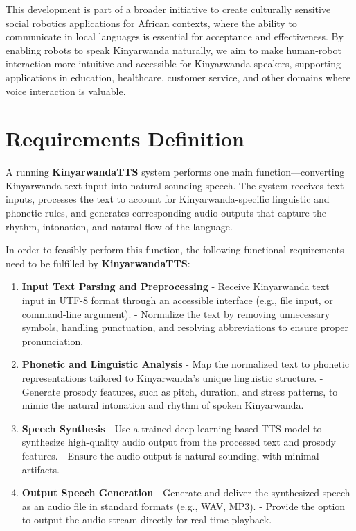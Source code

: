 \documentclass{CSSRforAfrica}
\begin{document}
This development is part of a broader initiative to create culturally sensitive social robotics applications for African contexts, where the ability to communicate in local languages is essential for acceptance and effectiveness. By enabling robots to speak Kinyarwanda naturally, we aim to make human-robot interaction more intuitive and accessible for Kinyarwanda speakers, supporting applications in education, healthcare, customer service, and other domains where voice interaction is valuable.

 
\newpage
\section{Requirements Definition}

A running \textbf{KinyarwandaTTS} system performs one main function—converting Kinyarwanda text input into natural-sounding speech. The system receives text inputs, processes the text to account for Kinyarwanda-specific linguistic and phonetic rules, and generates corresponding audio outputs that capture the rhythm, intonation, and natural flow of the language.  

In order to feasibly perform this function, the following functional requirements need to be fulfilled by \textbf{KinyarwandaTTS}:  

\begin{enumerate}

\item \textbf{Input Text Parsing and Preprocessing}  
   - Receive Kinyarwanda text input in UTF-8 format through an accessible interface (e.g., file input, or command-line argument).  
   - Normalize the text by removing unnecessary symbols, handling punctuation, and resolving abbreviations to ensure proper pronunciation.  

\item \textbf{Phonetic and Linguistic Analysis}  
   - Map the normalized text to phonetic representations tailored to Kinyarwanda's unique linguistic structure.  
   - Generate prosody features, such as pitch, duration, and stress patterns, to mimic the natural intonation and rhythm of spoken Kinyarwanda.  

\item \textbf{Speech Synthesis}
   - Use a trained deep learning-based TTS model to synthesize high-quality audio output from the processed text and prosody features.  
   - Ensure the audio output is natural-sounding, with minimal artifacts.  

\item \textbf{Output Speech Generation}  
   - Generate and deliver the synthesized speech as an audio file in standard formats (e.g., WAV, MP3).  
   - Provide the option to output the audio stream directly for real-time playback.  



\end{enumerate}
\end{document}

